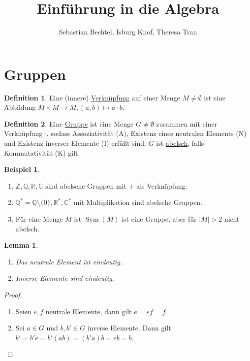 \documentclass[12pt]{scrartcl} %
\DeclareMathOperator{\sym}{Sym}
\newtheorem{lemma}{Lemma}
\theoremstyle{definition}
\newtheorem*{defn}{Definition}
\newtheorem{ex}{Beispiel}
\theoremstyle{remark}
\begin{document}
\author{Sebastian Bechtel, Isburg Knof, Theresa Tran} %
\title{Einführung in die Algebra}

\maketitle

\section{Gruppen}

\begin{defn}
	Eine (innere) \underline{Verknüpfung} auf einer Menge $M\neq \emptyset$ ist eine Abbildung $M\times M\to M, (a,b)\mapsto a\cdot b$.
\end{defn}

\begin{defn}
	Eine \underline{Gruppe} ist eine Menge $G\neq \emptyset$ zusammen mit einer Verknüpfung $\cdot$, sodass Assoziativität (A), Existenz eines neutralen Elements (N) und Existenz inverser Elemente (I) erfüllt sind.
	$G$ ist \underline{abelsch}, falls Kommutativität (K) gilt.
\end{defn}

\begin{ex}
	\begin{enumerate}
	\item $\mathbb{Z}, \mathbb{Q}, \mathbb{R}, \mathbb{C}$ sind abelsche Gruppen mit $+$ als Verknüpfung.
	\item $\mathbb{Q}^*=\mathbb{Q}\setminus \{0\}, \mathbb{R}^*, \mathbb{C}^*$ mit Multiplikation sind abelsche Gruppen.
	\item Für eine Menge $M$ ist $\sym(M)$ ist eine Gruppe, aber für $|M| > 2$ nicht abelsch.
	\end{enumerate}
\end{ex}

\begin{lemma}
	\begin{enumerate}[label=\alph*)]
	\item Das neutrale Element ist eindeutig.
	\item Inverse Elemente sind eindeutig.
	\end{enumerate}
\end{lemma}

\begin{proof}
	\begin{enumerate}[label=\alph*)]
	\item Seien $e,f$ neutrale Elemente, dann gilt $e=ef=f$.
	\item Sei $a\in G$ und $b,b'\in G$ inverse Elemente. Dann gilt $b'=b'e=b'(ab)=(b'a)b=eb=b$.
	\end{enumerate}
\end{proof}
\end{document}
